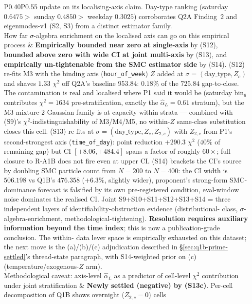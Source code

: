 \documentclass[11pt]{article}
\theoremstyle{definition}
\theoremstyle{plain}
\begin{document}
\begin{longtable}{P{0.40\textwidth}P{0.55\textwidth}}
update on its localising-axis claim. Day-type ranking (saturday
$0.6475 >$ sunday $0.4850 >$ weekday $0.3025$) corroborates Q2A
Finding~$2$ and eigenmodes-v1 (S2, S3) from a distinct estimator
family. \\
\addlinespace
How far $\sigma$-algebra enrichment on the localised axis can
go on this empirical process
& \textbf{Empirically bounded near zero at single-axis} by (S12),
\textbf{bounded above zero with wide CI at joint multi-axis} by
(S13), and \textbf{empirically un-tightenable from the SMC
estimator side} by (S14). (S12) re-fits M3 with the binding axis
(\texttt{hour\_of\_week}) $Z$ added at $\sigma = (\mathrm{day\_type},
Z_c)$ and shaves $1.33$ $\chi^2$ off Q2A's baseline $953.84$: $0.18\%$
of the $725.84$ gap-to-close. The contamination is real and
localised where P1 said it would be (saturday $\mathrm{bin}_6$
contributes $\chi^2 = 1634$ pre-stratification, exactly the
$\hat\alpha_L = 0.61$ stratum), but the M3 mixture-$2$ Gaussian
family is at capacity within strata --- combined with (S9)'s
$\chi^2$-indistinguishability of M3/M4/M5, no within-$Z$ same-class
substitution closes this cell. (S13) re-fits at $\sigma =
(\mathrm{day\_type}, Z_c, Z_{2,c})$ with $Z_{2,c}$ from P1's
second-strongest axis (\texttt{time\_of\_day}): point reduction
$+290.3$ $\chi^2$ ($40\%$ of remaining gap) but CI $[+8.06, +484.4]$
spans a factor of roughly $60\times$; full closure to R-A1B does
not fire even at upper CI. (S14) brackets the CI's source by
doubling SMC particle count from $N = 200$ to $N = 400$: the CI
width is $506.198$ vs Q1B's $476.358$ ($+6.3\%$, slightly wider),
proponent's strong-form SMC-dominance forecast is falsified by
its own pre-registered condition, eval-window noise dominates
the realised CI. Joint S9+S10+S11+S12+S13+S14 = three independent
layers of identifiability-obstruction evidence (distributional-
class, $\sigma$-algebra-enrichment, methodological-tightening).
\textbf{Resolution requires auxiliary information beyond the time
index}; this is now a publication-grade conclusion. The within-
data lever space is empirically exhausted on this dataset; the
next move is the (a)/(b)/(c) adjudication described in
\S\ref{sec:q1b-prime-settled}'s thread-state paragraph, with
S14-weighted prior on (c) (temperature/exogenous-$Z$ arm). \\
\addlinespace
Methodological caveat: axis-level $\hat\alpha_L$ as a predictor
of cell-level $\chi^2$ contribution under joint stratification
& \textbf{Newly settled (negative) by (S13c)}. Per-cell
decomposition of Q1B shows overnight ($Z_{2,c} = 0$) cells

\end{longtable}
\end{document}
